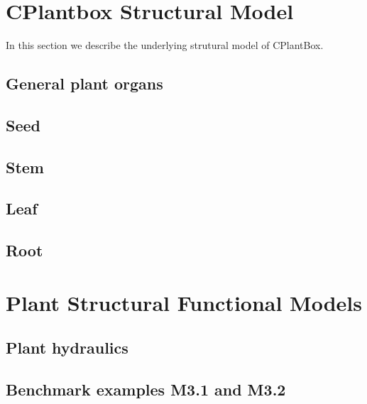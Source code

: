 \documentclass[a4paper]{article}
\begin{document}
\newpage
\section{CPlantbox Structural Model} \label{sec:cplantobx}

In this section we describe the underlying strutural model of CPlantBox. 

\subsection{General plant organs} \label{ssec:organs}


\subsection{Seed} \label{ssec:seed}


\subsection{Stem} \label{ssec:stem}


\subsection{Leaf} \label{ssec:leaf}


\subsection{Root} \label{ssec:root}





\newpage
\section{Plant Structural Functional Models} \label{sec:fspm}

\subsection{Plant hydraulics} \label{ssec:hydraulics}
% 

\subsection{Benchmark examples M3.1 and M3.2} \label{ssec:benchmarks3x}
% 
\end{document}

